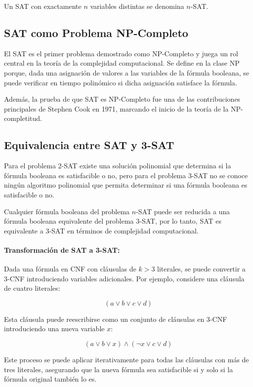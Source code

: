 \documentclass[12pt]{article}
\begin{document}
Un SAT con exactamente $n$ variables distintas se denomina $n$-SAT.

\subsection{SAT como Problema NP-Completo}

El SAT es el primer problema demostrado como NP-Completo \cite{authomataTheory} y juega un rol central en la teoría de la complejidad computacional. Se define en la clase NP porque, dada una asignación de valores a las variables de la fórmula booleana, se puede verificar en tiempo polinómico si dicha asignación satisface la fórmula.

Además, la prueba de que SAT es NP-Completo fue una de las contribuciones principales de Stephen Cook en 1971, marcando el inicio de la teoría de la NP-completitud.

\subsection{Equivalencia entre SAT y 3-SAT}

Para el problema 2-SAT existe una solución polinomial que determina si la fórmula booleana es satisfacible o no, pero para el problema 3-SAT no se conoce ningún algoritmo polinomial que permita
determinar si una fórmula booleana es satisfacible o no.

Cualquier fórmula booleana del problema $n$-SAT puede ser reducida a una fórmula booleana equivalente del problema 3-SAT, por lo tanto, SAT es equivalente a 3-SAT en términos de complejidad computacional.

\paragraph{Transformación de SAT a 3-SAT:}

Dada una fórmula en CNF con cláusulas de \( k > 3 \) literales, se puede convertir a 3-CNF introduciendo variables adicionales. Por ejemplo, considere una cláusula de cuatro literales:

\[
      (a \vee b \vee c \vee d)
\]

Esta cláusula puede reescribirse como un conjunto de cláusulas en 3-CNF introduciendo una nueva variable \( x \):

\[
      (a \vee b \vee x) \wedge (\neg x \vee c \vee d)
\]

Este proceso se puede aplicar iterativamente para todas las cláusulas con más de tres literales, asegurando que la nueva fórmula sea satisfacible si y solo si la fórmula original también lo es.
\end{document}

